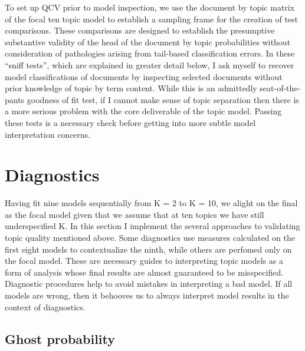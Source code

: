 \documentclass[]{book}
\theoremstyle{definition}
\theoremstyle{definition}
\theoremstyle{definition}
\theoremstyle{remark}
\begin{document}
To set up QCV prior to model inspection, we use the document by topic
matrix of the focal ten topic model to establish a sampling frame for
the creation of test comparisons. These comparisons are designed to
establish the presumptive substantive validity of the head of the
document by topic probabilities without consideration of pathologies
arising from tail-based classification errors. In these ``sniff tests'',
which are explained in greater detail below, I ask myself to recover
model classifications of documents by inspecting selected documents
without prior knowledge of topic by term content. While this is an
admittedly seat-of-the-pants goodness of fit test, if I cannot make
sense of topic separation then there is a more serious problem with the
core deliverable of the topic model. Passing these tests is a necessary
check before getting into more subtle model interpretation concerns.

\hypertarget{diagnostics}{%
\section{Diagnostics}\label{diagnostics}}

Having fit nine models sequentially from K = 2 to K = 10, we alight on
the final as the focal model given that we assume that at ten topics we
have still underspecified K. In this section I implement the several
approaches to validating topic quality mentioned above. Some diagnostics
use measures calculated on the first eight models to contextualize the
ninth, while others are perfomed only on the focal model. These are
necessary guides to interpreting topic models as a form of analysis
whose final results are almost guaranteed to be misspecified. Diagnostic
procedures help to avoid mistakes in interpreting a bad model. If all
models are wrong, then it behooves us to always interpret model results
in the context of diagnostics.

\hypertarget{ghost-probability}{%
\subsection{Ghost probability}\label{ghost-probability}}
\end{document}
